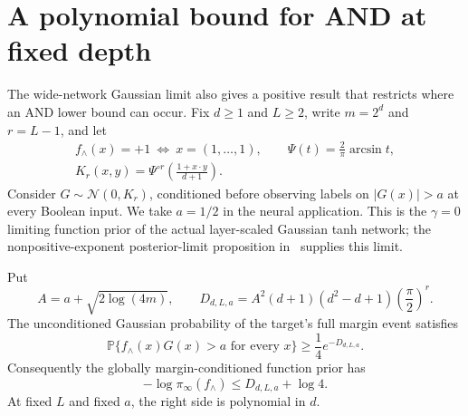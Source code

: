 \section{A polynomial bound for AND at fixed depth}
\label{gpupper:section}

The wide-network Gaussian limit also gives a positive result that
restricts where an AND lower bound can occur. Fix $d\ge1$ and $L\ge2$,
write $m=2^d$ and $r=L-1$, and let
\[
 \begin{gathered}
 f_\wedge(x)=+1\ \Longleftrightarrow\ x=(1,\ldots,1),
 \qquad \Psi(t)=\frac2\pi\arcsin t,\\
 K_r(x,y)=\Psi^{\circ r}\!\left(\frac{1+x\cdot y}{d+1}\right).
 \end{gathered}
\]
Consider $G\sim\mathcal N(0,K_r)$, conditioned before observing labels
on $|G(x)|>a$ at every Boolean input. We take $a=1/2$ in the neural
application. This is the $\gamma=0$ limiting function prior of the actual
layer-scaled Gaussian tanh network; the nonpositive-exponent
posterior-limit proposition in~\cite{nn-subcritical} supplies this limit.

\begin{theorem}\label{gpupper:mass}
Put
\begin{equation}\label{gpupper:budget}
 A=a+\sqrt{2\log(4m)},\qquad
 D_{d,L,a}=A^2(d+1)(d^2-d+1)\left(\frac\pi2\right)^r.
\end{equation}
The unconditioned Gaussian probability of the target's full margin
event satisfies
\begin{equation}\label{gpupper:rawmass}
 \mathbb P\{f_\wedge(x)G(x)>a\text{ for every }x\}
 \ge\frac14 e^{-D_{d,L,a}}.
\end{equation}
Consequently the globally margin-conditioned function prior has
\begin{equation}\label{gpupper:targetcost}
 -\log\pi_\infty(f_\wedge)\le D_{d,L,a}+\log4.
\end{equation}
At fixed $L$ and fixed $a$, the right side is polynomial in $d$.
\end{theorem}

